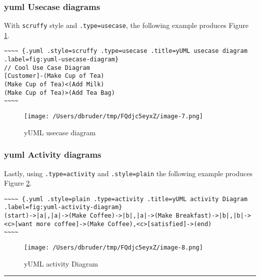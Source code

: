 \documentclass[]{article}
\begin{document}
\newpage

\subsubsection{yuml Usecase diagrams}\label{yuml-usecase-diagrams}

With \texttt{scruffy} style and \texttt{.type=usecase}, the following
example produces Figure \ref{fig:yuml-usecase-diagram}.

\scriptsize

\begin{verbatim}
~~~~ {.yuml .style=scruffy .type=usecase .title=yUML usecase diagram .label=fig:yuml-usecase-diagram}
// Cool Use Case Diagram
[Customer]-(Make Cup of Tea)
(Make Cup of Tea)<(Add Milk)
(Make Cup of Tea)>(Add Tea Bag)
~~~~
\end{verbatim}

\normalsize

\begin{figure}[htbp]
\centering
\texttt{[image: /Users/dbruder/tmp/FQdjc5eyxZ/image-7.png]}
\caption{yUML usecase diagram\label{fig:yuml-usecase-diagram}}
\end{figure}

\newpage

\subsubsection{yuml Activity diagrams}\label{yuml-activity-diagrams}

Lastly, using \texttt{.type=activity} and \texttt{.style=plain} the
following example produces Figure \ref{fig:yuml-activity-diagram}.

\scriptsize

\begin{verbatim}
~~~~ {.yuml .style=plain .type=activity .title=yUML activity Diagram .label=fig:yuml-activity-diagram}
(start)->|a|,|a|->(Make Coffee)->|b|,|a|->(Make Breakfast)->|b|,|b|-><c>[want more coffee]->(Make Coffee),<c>[satisfied]->(end)
~~~~
\end{verbatim}

\normalsize

\begin{figure}[htbp]
\centering
\texttt{[image: /Users/dbruder/tmp/FQdjc5eyxZ/image-8.png]}
\caption{yUML activity Diagram\label{fig:yuml-activity-diagram}}
\end{figure}

\begin{center}\rule{3in}{0.4pt}\end{center}
\end{document}
